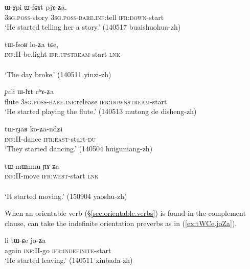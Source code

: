 \begin{exe} 
\ex \label{ex:WfCAt.pjAZa}
\gll ɯ-χpi ɯ-fɕɤt pjɤ-ʑa. \\
\textsc{3sg}.\textsc{poss}-story \textsc{3sg}.\textsc{poss}-\textsc{bare}.\textsc{inf}:tell \textsc{ifr}:\textsc{down}-start \\
\glt `He started telling her a story.' (140517 buaishuohua-zh)
\end{exe} 

\begin{exe} 
\ex \label{ex:tWfsoR.loZa}
\gll tɯ-fsoʁ lo-ʑa tɕe, \\
\textsc{inf}:II-be.light \textsc{ifr}:\textsc{upstream}-start \textsc{lnk} \\
\\
\glt `The day broke.' (140511 yinzi-zh)
\end{exe} 

\begin{exe} 
\ex \label{ex:WlAt.chAZa}
\gll  ɟuli ɯ-lɤt cʰɤ-ʑa  \\
flute  \textsc{3sg}.\textsc{poss}-\textsc{bare}.\textsc{inf}:release \textsc{ifr}:\textsc{downstream}-start \\
\glt `He started playing the flute.' (140513 mutong de disheng-zh)
\end{exe} 

\begin{exe} 
\ex \label{ex:tWrJaR.koZandZi}
\gll tɯ-rɟaʁ ko-ʑa-ndʑi \\
\textsc{inf}:II-dance \textsc{ifr}:\textsc{east}-start-\textsc{du} \\
\glt `They started dancing.' (140504 huiguniang-zh)
\end{exe} 

\begin{exe} 
\ex \label{ex:tWmWnmu.YAZa}
\gll tɯ-mɯnmu ɲɤ-ʑa \\
\textsc{inf}:II-move \textsc{ifr}:\textsc{west}-start \textsc{lnk} \\
\\
\glt `It started moving.' (150904 yaoshu-zh)
\end{exe} 

When an orientable verb (§\ref{sec:orientable.verbs}) is found in the complement clause,  can take the indefinite orientation preverbs as in (\ref{ex:tWCe.joZa}).

\begin{exe} 
\ex \label{ex:tWCe.joZa}
\gll li tɯ-ɕe jo-ʑa \\
again \textsc{inf}:II-go \textsc{ifr}:\textsc{indefinite}-start \\
\glt `He started leaving.' (140511 xinbada-zh)
\end{exe} 

